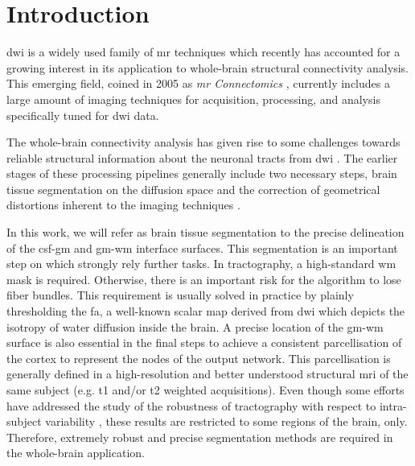 \section{Introduction}
\label{sec:introduction}
%
\ac{dwi} is a widely used family of \ac{mr} techniques
\citep{sundgren_diffusion_2004} which recently has accounted for a growing
interest in its application to whole-brain structural connectivity analysis.
This emerging field, coined in 2005 as \emph{\ac{mr} Connectomics}
\citep{hagmann_diffusion_2005,sporns_human_2005}, currently includes a
large amount of imaging techniques for acquisition, processing, and analysis
specifically tuned for \ac{dwi} data.

The whole-brain connectivity analysis has given rise to some challenges
towards reliable structural information
about the neuronal tracts from \ac{dwi} \cite{johansen-berg_using_2009,
jones_white_2012}. The earlier stages of these
processing pipelines generally include two necessary steps, brain tissue
segmentation on the diffusion space and the correction of geometrical
distortions inherent to the imaging techniques \citep{hagmann_mr_2012}.

In this work, we will refer as brain tissue segmentation to the precise
delineation of the \ac{csf}-\ac{gm} and \ac{gm}-\ac{wm} interface surfaces.
This segmentation is an important step on which strongly rely further
tasks. In tractography, a high-standard \ac{wm} mask is required. Otherwise,
there is an important risk for the algorithm to lose fiber bundles. This
requirement is usually solved in practice by plainly thresholding the 
\ac{fa}, a well-known scalar map derived from \ac{dwi} which depicts 
the isotropy of water diffusion inside the brain. 
A precise location of the
\ac{gm}-\ac{wm} surface is also essential in the final steps to
achieve a consistent parcellisation of the cortex to represent the nodes 
of the output network. This parcellisation is generally defined in a 
high-resolution and better understood structural \ac{mri} of the same 
subject (e.g. \ac{t1} and/or \ac{t2} weighted acquisitions). %
Even though some efforts have addressed
the study of the robustness of tractography with respect to intra-subject variability
\cite{wakana_reproducibility_2007,heiervang_between_2006}, these results are restricted to some regions of the brain, only. Therefore, extremely robust
and precise segmentation methods are required in the whole-brain application. 

